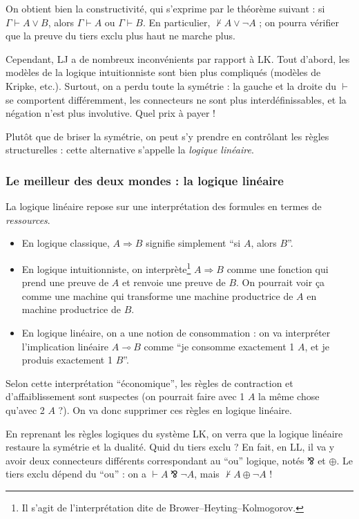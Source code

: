 \documentclass[a4paper, 11pt]{article}
\newcommand{\parr}{\mathbin{⅋}}
\begin{document}
On obtient bien la constructivité, qui s'exprime par le théorème suivant : si $\Gamma \vdash A \lor B$, alors $\Gamma \vdash A$ ou $\Gamma \vdash B$. En particulier, $\not\vdash A \lor \neg A$ ; on pourra vérifier que la preuve du tiers exclu plus haut ne marche plus.

Cependant, LJ a de nombreux inconvénients par rapport à LK. Tout d'abord, les modèles de la logique intuitionniste sont bien plus compliqués (modèles de Kripke, etc.). Surtout, on a perdu toute la symétrie : la gauche et la droite du $\vdash$ se comportent différemment, les connecteurs ne sont plus interdéfinissables, et la négation n'est plus involutive. Quel prix à payer !

Plutôt que de briser la symétrie, on peut s'y prendre en contrôlant les règles structurelles : cette alternative s'appelle la \emph{logique linéaire}.

\subsubsection{Le meilleur des deux mondes : la logique linéaire}

La logique linéaire repose sur une interprétation des formules en termes de \emph{ressources}.
\begin{itemize}
\item En logique classique, $A \Rightarrow B$ signifie simplement \enquote{si $A$, alors $B$}.
\item En logique intuitionniste, on interprète\footnote{Il s'agit de l'interprétation dite de Brower--Heyting--Kolmogorov.} $A \Rightarrow B$ comme une fonction qui prend une preuve de $A$ et renvoie une preuve de $B$. On pourrait voir ça comme une machine qui transforme une machine productrice de $A$ en machine productrice de $B$.
\item En logique linéaire, on a une notion de consommation : on va interpréter l'implication linéaire $A \multimap B$ comme \enquote{je consomme exactement 1 $A$, et je produis exactement 1 $B$}.
\end{itemize}
Selon cette interprétation \enquote{économique}, les règles de contraction et d'affaiblissement sont suspectes (on pourrait faire avec 1 $A$ la même chose qu'avec 2 $A$ ?). On va donc supprimer ces règles en logique linéaire.

En reprenant les règles logiques du système LK, on verra que la logique linéaire restaure la symétrie et la dualité. Quid du tiers exclu ? En fait, en LL, il va y avoir deux connecteurs différents correspondant au \enquote{ou} logique, notés $\parr$ et $\oplus$. Le tiers exclu dépend du \enquote{ou} : on a $\vdash A \parr \neg A$, mais $\not\vdash A \oplus \neg A$ !
\end{document}

